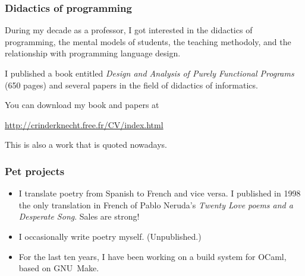 \documentclass[compress,dvips,xcolor={dvipsnames},t]{beamer}
\begin{document}
\begin{frame}
  \frametitle{Didactics of programming}

  During my decade as a professor, I got interested in the didactics
  of programming, the mental models of students, the teaching
  methodoly, and the relationship with programming language design.

  \bigskip

  I published a book entitled \emph{Design and Analysis of Purely
    Functional Programs} (650 pages) and several papers in the field
  of didactics of informatics.

  \bigskip

  You can download my book and papers at
  \begin{center}
  \url{http://crinderknecht.free.fr/CV/index.html}
  \end{center}
  
  \bigskip

  This is also a work that is quoted nowadays.

\end{frame}

\begin{frame}
  \frametitle{Pet projects}

  \begin{itemize}

    \item I translate poetry from Spanish to French and vice versa. I
      published in 1998 the only translation in French of Pablo
      Neruda's \emph{Twenty Love poems and a Desperate Song}. Sales
      are strong!

    \item I occasionally write poetry myself. (Unpublished.)

    \item For the last ten years, I have been working on a build
      system for OCaml, based on GNU~Make.

  \end{itemize}

\end{frame}
\end{document}
